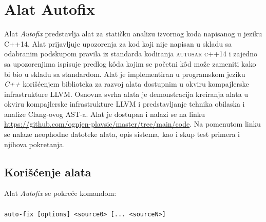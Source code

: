 \documentclass[12pt,oneside]{memoir}
\begin{document}
\chapter{Alat Autofix}
\label{chp:autofix}

Alat \textit{Autofix} predstavlja alat za stati\v{c}ku analizu izvornog koda napisanog u jeziku C++14. Alat prijavljuje upozorenja
za kod koji nije napisan u skladu sa odabranim podskupom pravila iz standarda kodiranja \textsc{autosar c++14} i zajedno sa upozorenjima
ispisuje predlog k\^{o}da kojim se po\v{c}etni k\^{o}d mo\v{z}e zameniti kako bi bio u skladu sa standardom.
Alat je implementiran u programskom jeziku \textit{C++} kori\v{s}\'{c}enjem biblioteka za razvoj alata dostupnim u okviru kompajlerske infrastrukture LLVM.
Osnovna svrha alata je demonstracija kreiranja alata u okviru kompajlerske infrastrukture LLVM i predstavljanje tehnika obilaska i analize Clang-ovog AST-a. 
Alat je dostupan i nalazi se na linku \url{https://github.com/ognjen-plavsic/master/tree/main/code}. Na pomenutom linku se nalaze neophodne datoteke alata, opis
sistema, kao i skup test primera i njihova pokretanja.

\section{Kori\v{s}\'{c}enje alata}

Alat \textit{Autofix} se pokre\'{c}e komandom:
\\ \\
 \indent \indent \texttt{auto-fix [options] <source0> [... <sourceN>]}
\\ 
\end{document}
